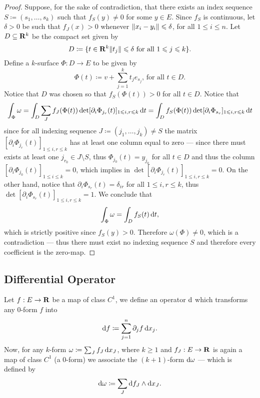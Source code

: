\begin{proof}
    Suppose, for the sake of contradiction, that there exists an index sequence \(S
    \coloneq (s_1, \dots, s_{k})\) such that \(f_{S}(y) \neq 0\) for some \(y \in
    E\). Since \(f_{S}\) is continuous, let \(\delta > 0\) be such that \(f_J(x) >
    0\) whenever \(\lVert x_i - y_i\rVert \leqslant \delta\), for all \(1 \leq i \leq n\). Let
    \(D \subseteq \mathbf{R}^k\) be the compact set given by
    \[
        D \coloneq \{t \in \mathbf{R}^{k} \relax \lVert t_j\rVert \leqslant \delta
        \text{ for all } 1 \leqslant j \leqslant k\}.
    \]
    Define a \(k\)-surface \(\Phi: D \to E\) to be given by
    \[
        \Phi(t) \coloneq v + \sum_{j=1}^k t_j e_{s_j}\text{, for all } t \in D.
    \]
    Notice that \(D\) was chosen so that \(f_S(\Phi(t)) > 0\) for all \(t \in
    D\). Notice that
    \[
        \int_{\Phi} \omega = \int_D \sum_J f_J(\Phi(t))
        \det[\partial_i \Phi_{j_r}(t)]_{1 \leqslant i, r \leqslant k}\, \mathrm{d} t
        = \int_D f_S(\Phi(t)) \det[\partial_i \Phi_{s_r}]_{1 \leqslant i, r \leqslant k}\, \mathrm{d} t
    \]
    since for all indexing sequence \(J \coloneq (j_1, \dots, j_k) \neq S\)
    the matrix \([\partial_i \Phi_{j_r}(t)]_{1 \leq i, r \leq k}\) has at least one
    column equal to zero --- since there must exists at least one \(j_{r_0} \in J
    \setminus S\), thus \(\Phi_{j_0}(t) = y_{j_0}\) for all \(t \in D\) and thus the
    column \([\partial_i \Phi_{j_0}(t)]_{1 \leq i \leq k} = 0\), which implies in
    \(\det [\partial_i \Phi_{j_r}(t)]_{1 \leq i, r \leq k} = 0\). On the other hand,
    notice that \(\partial_i \Phi_{s_r}(t) = \delta_{i r}\) for all \(1 \leq i, r
    \leq k\), thus \(\det [\partial_i \Phi_{s_r}(t)]_{1 \leq i, r \leq k} = 1\). We
    conclude that
    \[
        \int_{\Phi} \omega = \int_D f_S(t)\, \mathrm{d} t,
    \]
    which is strictly positive since \(f_S(y) > 0\). Therefore \(\omega(\Phi) \neq
    0\), which is a contradiction --- thus there must exist no indexing sequence
    \(S\) and therefore every coefficient is the zero-map.
\end{proof}

\subsection{Differential Operator}

\begin{definition}
    \label{def:differential-operator-form}
    Let \(f: E \to \mathbf{R}\) be a map of class \(C^1\), we define an operator \(\mathrm{d}\)
    which transforms any \(0\)-form \(f\) into
    \[
        \mathrm{d} f \coloneq \sum_{j=1}^n \partial_j f\, \mathrm{d} x_j.
    \]
    Now, for any \(k\)-form \(\omega \coloneq \sum_J f_J\, \mathrm{d} x_J\), where \(k
    \geq 1\) and \(f_J: E \to \mathbf{R}\) is again a map of class \(C^1\) (a \(0\)-form) we
    associate the \((k+1)\)-form \(\mathrm{d} \omega\) --- which is defined by
    \[
        \mathrm{d} \omega \coloneq \sum_J \mathrm{d} f_J \wedge \mathrm{d} x_{J}.
    \]
\end{definition}

